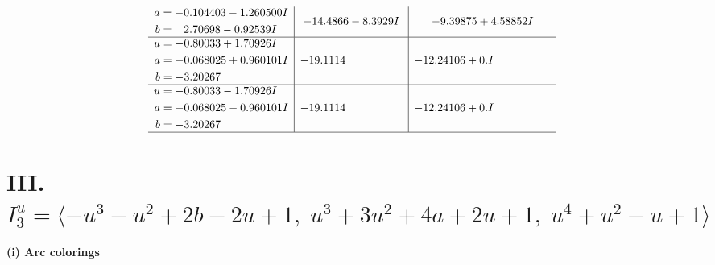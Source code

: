 \documentclass[1p]{elsarticle_modified}
\theoremstyle{definition}
\begin{document}
$$\begin{array}{c|c|c}
\begin{aligned}
a &= -0.104403 - 1.260500 I \\
b &= \phantom{-}2.70698 - 0.92539 I\end{aligned}
 & -14.4866 - 8.3929 I & -9.39875 + 4.58852 I \\ \hline\begin{aligned}
u &= -0.80033 + 1.70926 I \\
a &= -0.068025 + 0.960101 I \\
b &= -3.20267\phantom{ +0.000000I}\end{aligned}
 & -19.1114\phantom{ +0.000000I} & -12.24106 + 0. I\phantom{ +0.000000I} \\ \hline\begin{aligned}
u &= -0.80033 - 1.70926 I \\
a &= -0.068025 - 0.960101 I \\
b &= -3.20267\phantom{ +0.000000I}\end{aligned}
 & -19.1114\phantom{ +0.000000I} & -12.24106 + 0. I\phantom{ +0.000000I}\\
 \hline 
 \end{array}$$\newpage\newpage\renewcommand{\arraystretch}{1}
\centering \section*{III. $I^u_{3}= \langle - u^3- u^2+2 b-2 u+1,\;u^3+3 u^2+4 a+2 u+1,\;u^4+u^2- u+1 \rangle$}
\flushleft \textbf{(i) Arc colorings}\\
\end{document}
